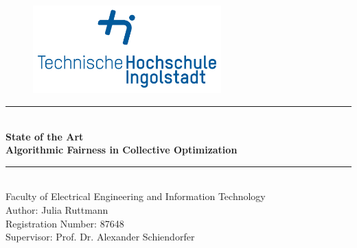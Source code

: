 \documentclass[german, a4paper, 11pt, oneside]{scrbook}
\begin{document}
\thispagestyle{empty}
\begin{figure}[t]
 \centering
 \includegraphics[height=3.4cm, trim=1.2cm 1.2cm 1.2cm 1.2cm]{thi_logo}
\end{figure}
\begin{center}
\vspace*{2cm}

\vspace*{2cm}
\par\noindent\rule{\textwidth}{0.2pt}
\\
\vspace*{0.5cm}
{\huge \textbf{State of the Art}}\\
{\LARGE \textbf{Algorithmic Fairness in Collective Optimization}}
\par\noindent\rule{\textwidth}{0.2pt}
\\
\vspace*{2cm}
{\huge Faculty of Electrical Engineering and Information Technology}
\\
\vspace*{2cm}
{\LARGE Author: Julia Ruttmann \\Registration Number: 87648\\Supervisor: Prof. Dr. Alexander Schiendorfer\\}

\end{center}
\newpage
\tableofcontents
\thispagestyle{empty}
\newpage
\setcounter{page}{1}
\end{document}
